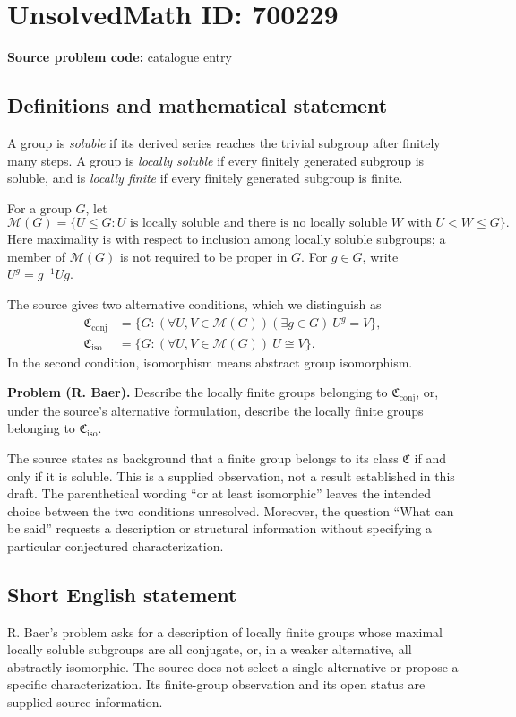 \documentclass[11pt]{article}
\begin{document}
\section*{UnsolvedMath ID: 700229}
\textbf{Source problem code:} catalogue entry
\subsection{Definitions and mathematical statement}
A group is \emph{soluble} if its derived series reaches the trivial subgroup after finitely many steps. A group is \emph{locally soluble} if every finitely generated subgroup is soluble, and is \emph{locally finite} if every finitely generated subgroup is finite.

For a group \(G\), let
\[
\mathcal M(G)=\{U\leq G: U\text{ is locally soluble and there is no locally soluble }W\text{ with }U<W\leq G\}.
\]
Here maximality is with respect to inclusion among locally soluble subgroups; a member of \(\mathcal M(G)\) is not required to be proper in \(G\). For \(g\in G\), write \(U^g=g^{-1}Ug\).

The source gives two alternative conditions, which we distinguish as
\[
\begin{aligned}
\mathfrak C_{\mathrm{conj}}
&=\{G: (\forall U,V\in\mathcal M(G))(\exists g\in G)\ U^g=V\},\\
\mathfrak C_{\mathrm{iso}}
&=\{G: (\forall U,V\in\mathcal M(G))\ U\cong V\}.
\end{aligned}
\]
In the second condition, isomorphism means abstract group isomorphism.

\textbf{Problem (R. Baer).} Describe the locally finite groups belonging to \(\mathfrak C_{\mathrm{conj}}\), or, under the source's alternative formulation, describe the locally finite groups belonging to \(\mathfrak C_{\mathrm{iso}}\).

The source states as background that a finite group belongs to its class \(\mathfrak C\) if and only if it is soluble. This is a supplied observation, not a result established in this draft. The parenthetical wording ``or at least isomorphic'' leaves the intended choice between the two conditions unresolved. Moreover, the question ``What can be said'' requests a description or structural information without specifying a particular conjectured characterization.
\subsection{Short English statement}
R. Baer's problem asks for a description of locally finite groups whose maximal locally soluble subgroups are all conjugate, or, in a weaker alternative, all abstractly isomorphic. The source does not select a single alternative or propose a specific characterization. Its finite-group observation and its open status are supplied source information.
\end{document}
